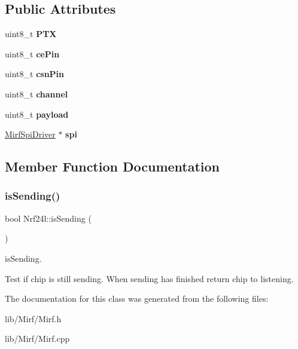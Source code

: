 \subsection*{Public Attributes}
\begin{DoxyCompactItemize}
\item 
\mbox{\label{class_nrf24l_a58c788a2ef33a73cc0a3bd716c12e49e}} 
uint8\+\_\+t {\bfseries P\+TX}
\item 
\mbox{\label{class_nrf24l_a4e8e794fc8b0abe2c5ca960468626851}} 
uint8\+\_\+t {\bfseries ce\+Pin}
\item 
\mbox{\label{class_nrf24l_a4edd1fbea934ad4a7ec2272de58515a0}} 
uint8\+\_\+t {\bfseries csn\+Pin}
\item 
\mbox{\label{class_nrf24l_a73f769c1bc4f9e94208c0478bb03c39a}} 
uint8\+\_\+t {\bfseries channel}
\item 
\mbox{\label{class_nrf24l_a9d3639ab2bc390cf388bba3652685e24}} 
uint8\+\_\+t {\bfseries payload}
\item 
\mbox{\label{class_nrf24l_a7cb95618faa779543259c2f083dc3d35}} 
\hyperlink{class_mirf_spi_driver}{Mirf\+Spi\+Driver} $\ast$ {\bfseries spi}
\end{DoxyCompactItemize}


\subsection{Member Function Documentation}
\mbox{\label{class_nrf24l_a897a4cfe23126a06ec5f5beb011fa3d9}} 
\subsubsection{\texorpdfstring{is\+Sending()}{isSending()}}
{\footnotesize\ttfamily bool Nrf24l\+::is\+Sending (\begin{DoxyParamCaption}{ }\end{DoxyParamCaption})}

is\+Sending.

Test if chip is still sending. When sending has finished return chip to listening. 

The documentation for this class was generated from the following files\+:\begin{DoxyCompactItemize}
\item 
lib/\+Mirf/Mirf.\+h\item 
lib/\+Mirf/Mirf.\+cpp\end{DoxyCompactItemize}
